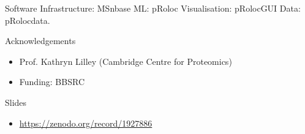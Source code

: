 \documentclass[bigger]{beamer}
\newcommand{\Rpackage}[1]{{\mbox{\normalfont\textsf{#1}}}}
\begin{document}
  \begin{frame}

   \begin{block}{Software}
     \vspace{.1cm}
     Infrastructure: \Rpackage{MSnbase} \newline
     ML: \Rpackage{pRoloc} \newline
     Visualisation: \Rpackage{pRolocGUI} \newline
     Data: \Rpackage{pRolocdata}.
    \vspace{.2cm}
  \end{block}

  \begin{block}{Acknowledgements}
    \begin{itemize}
    \item Prof. Kathryn Lilley (Cambridge Centre for Proteomics)
    \item Funding: BBSRC
    \end{itemize}
  \end{block}

  \begin{block}{Slides}
    \begin{itemize}
    \item \url{https://zenodo.org/record/1927886}
    \end{itemize}
  \end{block}

  \end{frame}
\end{document}
